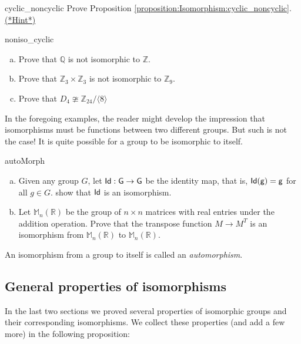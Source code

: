 \begin{exercise}{cyclic_noncyclic} 
Prove Proposition \ref{proposition:Isomorphism:cyclic_noncyclic}.
\hyperref[sec:Isomorphism:hints]{(*Hint*)}
\end{exercise}



\begin{exercise}{noniso_cyclic}
\begin{enumerate}[(a)]
\item
Prove that ${\mathbb Q}$ is not isomorphic to ${\mathbb Z}$.
\item
Prove that  ${\mathbb Z}_3 \times {\mathbb Z}_3$ is not isomorphic to ${\mathbb Z}_9$. 
\item
Prove that  $D_4 \ncong {\mathbb Z}_{24} / \langle 8 \rangle$
\end{enumerate}
\end{exercise}

In the foregoing examples, the reader might develop the impression that isomorphisms must be functions between two different groups. But such is not the case!  It is quite possible for a group to be isomorphic to itself.

\begin{exercise}{autoMorph}
\begin{enumerate}[(a)]
\item
Given any group $G$, let $\sf{Id}:G \rightarrow G$ be the identity map, that is, $\sf{Id}(g)=g$ for all $g \in G$.  show that $\sf{Id}$ is an isomorphism.
\item
Let $\mathbb{M}_n(\mathbb{R})$ be the group of $n\times n$ matrices with real entries under the addition operation. Prove that the transpose function $M \rightarrow M^T$ is an isomorphism from  $\mathbb{M}_n(\mathbb{R})$ to $\mathbb{M}_n(\mathbb{R})$.
\end{enumerate}
\end{exercise}

An isomorphism from a group to itself is called an \emph{automorphism}.


\subsection{General properties of isomorphisms\quad
{}}\label{iso_properties}
In the last two sections we  proved several properties of isomorphic groups and their corresponding isomorphisms.  We collect these properties (and add a few more) in the following proposition:

